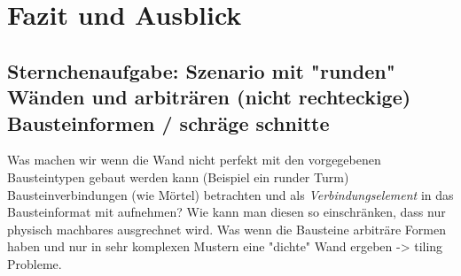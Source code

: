 \chapter{Fazit und Ausblick}

\section{Sternchenaufgabe: Szenario mit "runden" Wänden und arbiträren (nicht rechteckige) Bausteinformen / schräge schnitte}
Was machen wir wenn die Wand nicht perfekt mit den vorgegebenen Bausteintypen gebaut werden kann (Beispiel ein runder Turm)
Bausteinverbindungen (wie Mörtel) betrachten und als \textit{Verbindungselement} in das Bausteinformat mit aufnehmen? Wie kann man diesen so einschränken, dass nur physisch machbares ausgrechnet wird.
Was wenn die Bausteine arbiträre Formen haben und nur in sehr komplexen Mustern eine "dichte" Wand ergeben -> tiling Probleme.

